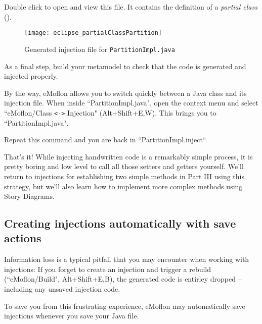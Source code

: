 \begin{stepbystep}
\item Double click to open and view this file. It contains the definition of a \textit{partial class}
().

\begin{figure}[htbp]
    \centering
    \texttt{[image: eclipse\_partialClassPartition]}
    \caption{Generated injection file for \texttt{PartitionImpl.java}}
    \label{eclipse:injection_partialClassPartition}
\end{figure}

\clearpage

\item As a final step, build your metamodel to check that the code is generated and injected properly.

\item By the way, eMoflon allows you to switch quickly between a Java class and its injection file.
When inside ``PartitionImpl.java", open the context menu and select ``eMoflon/Class \verb|<->| Injection" (Alt+Shift+E,W).
This brings you to ``PartitionImpl.java".

Repeat this command and you are back in ``PartitionImpl.inject``.


\item That's it! While injecting handwritten code is a remarkably simple process, it is pretty boring and low level to call all those
setters and getters yourself. We'll return to injections for establishing two simple methods in Part III using this strategy, but we'll also learn how to
implement more complex methods using Story Diagrams.
 
\end{stepbystep}

\subsection*{Creating injections automatically with save actions}

Information loss is a typical pitfall that you may encounter when working with injections:
If you forget to create an injection and trigger a rebuild (``eMoflon/Build", Alt+Shift+E,B), the generated code is entirley dropped -- including any unsaved injection code.

To save you from this frustrating experience, eMoflon may automatically save injections whenever you save your Java file.

